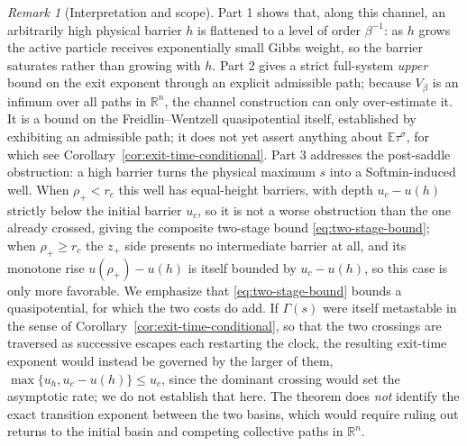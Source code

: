 \documentclass{article}
\theoremstyle{plain}
\theoremstyle{definition}
\theoremstyle{remark}
\newtheorem{remark}[theorem]{Remark}
\newcommand{\R}{\mathbb{R}}
\newcommand{\E}{\mathbb{E}}
\begin{document}
\begin{remark}[Interpretation and scope]
\label{rem:scope}
Part 1 shows that, along this channel, an arbitrarily high physical barrier $h$ is flattened to a level of order $\beta^{-1}$: as $h$ grows the active particle receives exponentially small Gibbs weight, so the barrier saturates rather than growing with $h$. Part 2 gives a strict full-system \emph{upper} bound on the exit exponent through an explicit admissible path; because $V_\beta$ is an infimum over all paths in $\R^n$, the channel construction can only over-estimate it. It is a bound on the Freidlin--Wentzell quasipotential itself, established by exhibiting an admissible path; it does not yet assert anything about $\E\tau^\sigma$, for which see Corollary~\ref{cor:exit-time-conditional}. Part 3 addresses the post-saddle obstruction: a high barrier turns the physical maximum $s$ into a Softmin-induced well. When $\rho_+<r_c$ this well has equal-height barriers, with depth $u_c-u(h)$ strictly below the initial barrier $u_c$, so it is not a worse obstruction than the one already crossed, giving the composite two-stage bound \eqref{eq:two-stage-bound}; when $\rho_+\ge r_c$ the $z_+$ side presents no intermediate barrier at all, and its monotone rise $u(\rho_+)-u(h)$ is itself bounded by $u_c-u(h)$, so this case is only more favorable. We emphasize that \eqref{eq:two-stage-bound} bounds a quasipotential, for which the two costs do add. If $\Gamma(s)$ were itself metastable in the sense of Corollary~\ref{cor:exit-time-conditional}, so that the two crossings are traversed as successive escapes each restarting the clock, the resulting exit-time exponent would instead be governed by the larger of them, $\max\{u_h,u_c-u(h)\}\le u_c$, since the dominant crossing would set the asymptotic rate; we do not establish that here. The theorem does \emph{not} identify the exact transition exponent between the two basins, which would require ruling out returns to the initial basin and competing collective paths in $\R^n$.
\end{remark}
\end{document}
